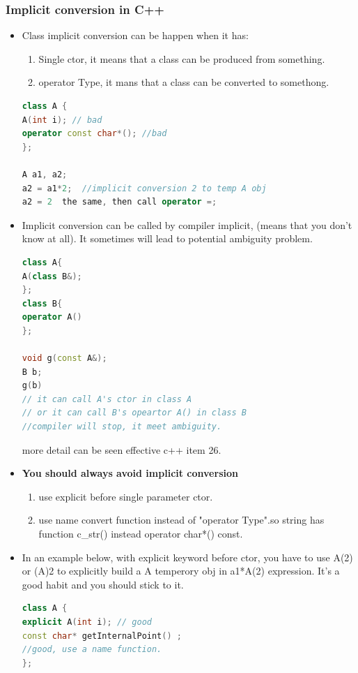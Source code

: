 \documentclass[a4paper,12pt,twoside]{book}
\begin{document}
\subsubsection{Implicit conversion in C++}
\begin{itemize}

\item Class implicit conversion can be happen when it has:
\begin{enumerate}
	\item Single ctor, it means that a class can be produced from something.
	\item operator Type, it mans that a class can be converted to somethong.
\end{enumerate}

\begin{lstlisting}[frame=single, language=c++]
class A {
A(int i); // bad
operator const char*(); //bad
};

A a1, a2;
a2 = a1*2;  //implicit conversion 2 to temp A obj
a2 = 2  the same, then call operator =;
\end{lstlisting}

\item Implicit conversion can be called by compiler implicit, (means that you don't know at all). It sometimes will lead to potential ambiguity problem.
\begin{lstlisting}[frame=single, language=c++]
class A{
A(class B&);
};
class B{
operator A()
};

void g(const A&);
B b;
g(b)
// it can call A's ctor in class A
// or it can call B's opeartor A() in class B
//compiler will stop, it meet ambiguity.
\end{lstlisting}
more detail can be seen effective c++ item 26.

\item \textbf{You should always avoid implicit conversion}
\begin{enumerate}
\item use explicit before single parameter ctor.
\item use name convert function instead of  "operator Type".so string has function c\_str() instead operator char*() const. 
\end{enumerate}

\item In an example below, with explicit keyword before ctor,  you have to use A(2) or (A)2 to explicitly build a A temperory obj in a1*A(2) expression. It's a good habit and you should stick to it. 
\begin{lstlisting}[frame=single, language=c++]
class A {
explicit A(int i); // good
const char* getInternalPoint() ;
//good, use a name function.
};
\end{lstlisting}


\end{itemize}
\end{document}
